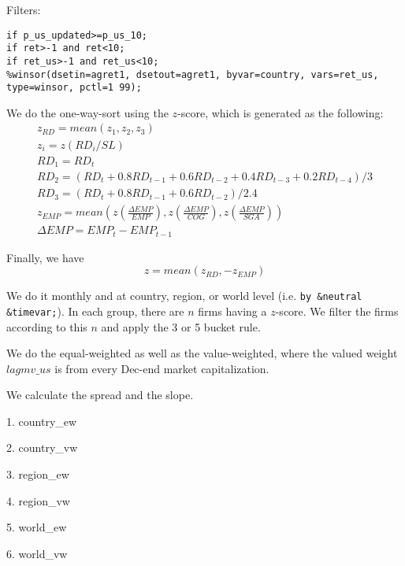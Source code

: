 





\thispagestyle{fancy}

\newcommand{\code}{\texttt}
\newcommand*{\Commonpath}{20181211/ret/SL}

Filters:

\code{if p\_us\_updated>=p\_us\_10;} \\
\code{if ret>-1 and ret<10;} \\
\code{if ret\_us>-1 and ret\_us<10;} \\
\code{\%winsor(dsetin=agret1, dsetout=agret1, byvar=country, vars=ret\_us, type=winsor, pctl=1 99);}


We do the one-way-sort using the $z$-score, which is generated as the following:
$$
\begin{aligned}
& z_{RD} = mean(z_1, z_2, z_3) \\
& z_i = z(RD_i/SL) \\
& RD_1 = RD_t \\
& RD_2 = (RD_t + 0.8RD_{t-1} + 0.6RD_{t-2} + 0.4RD_{t-3} + 0.2RD_{t-4})/3 \\
& RD_3 = (RD_t + 0.8RD_{t-1} + 0.6RD_{t-2})/2.4 
& \\
& z_{EMP} = mean(z(\frac{\Delta EMP}{EMP}), z(\frac{\Delta EMP}{COG}), z(\frac{\Delta EMP}{SGA})) \\
& \Delta EMP = EMP_t - EMP_{t-1}
\end{aligned}
$$

Finally, we have
$$
z = mean(z_{RD}, -z_{EMP})
$$


We do it monthly and at country, region, or world level (i.e. \code{by \&neutral \&timevar;}). In each group, there are $n$ firms having a $z$-score. We filter the firms according to this $n$ and apply the 3 or 5 bucket rule.

We do the equal-weighted as well as the value-weighted, where the valued weight $lagmv\_us$ is from every Dec-end market capitalization.

We calculate the spread and the slope.

1. country\_ew


2. country\_vw


3. region\_ew


4. region\_vw


5. world\_ew


6. world\_vw



